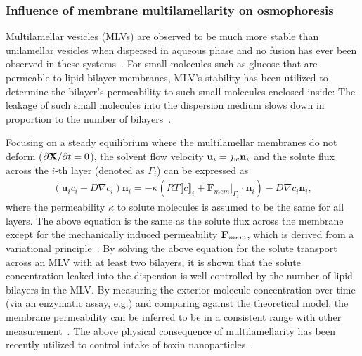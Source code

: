 \documentclass[11pt]{article}
\begin{document}
\subsubsection{Influence of membrane multilamellarity on osmophoresis
\label{subsubsec:Influence_membrane_multilamellarity}}
Multilamellar vesicles (MLVs) are observed to be much more stable than
unilamellar vesicles when dispersed in aqueous phase and no fusion has
ever been observed in these systems~\cite{Lasic1988_BiochemJ}.  For
small molecules such as glucose that are permeable to lipid bilayer
membranes, MLV's stability has been utilized to determine the bilayer's
permeability to such small molecules enclosed inside: The leakage of
such small molecules into the dispersion medium slows down in proportion
to the number of bilayers~\cite{Faure2006_BJ}.

Focusing on a steady equilibrium where the multilamellar membranes do
not deform ($\partial {\bf X}/\partial t=0$), the solvent flow velocity
${\bf u}_i = j_w {\bf n}_i$ and the solute flux across the $i$-th layer
(denoted as $\Gamma_i$) can be expressed as
\begin{align}
\label{eq:solute_flux}
\left(\mathbf{u}_i c_i - D\nabla c_i\right)\mathbf{n}_i = -\kappa
  \left(RT\llbracket c \rrbracket_i + \mathbf{F}_{mem}\rvert_{\Gamma_i} 
  \cdot \mathbf{n}_i\right)-D\nabla c_i \mathbf{n}_i,
\end{align}
where the permeability $\kappa$ to solute molecules is assumed to be the
same for all layers. The above equation is the same as the solute flux
across the membrane except for the mechanically induced permeability
${\bf F}_{mem}$, which is derived from a variational
principle~\cite{YaoMori2017_JCP}.  By solving the above equation for the
solute transport across an MLV with at least two bilayers, it is shown
that the solute concentration leaked into the dispersion is well
controlled by the number of lipid bilayers in the MLV.  By measuring the
exterior molecule concentration over time (via an enzymatic assay, e.g.)
and comparing against the theoretical model, the membrane permeability
can be inferred to be in a consistent range with other
measurement~\cite{Faure2006_BJ}.  The above physical consequence of
multilamellarity has been recently utilized to control intake of toxin
nanoparticles~\cite{Kerdudo2014_FoodChem}.
\end{document}
